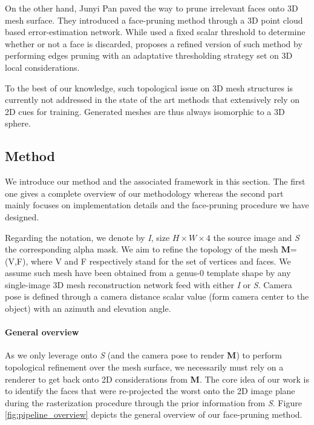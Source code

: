 On the other hand, Junyi Pan \etal \citep{pan2019deep} paved the way to prune irrelevant faces onto 3D mesh surface. They introduced a face-pruning method through a 3D point cloud based error-estimation network. While \citep{pan2019deep} used a fixed scalar threshold to determine whether or not a face is discarded, \citep{nie2020total3dunderstanding} proposes a refined version of such method by performing edges pruning with an adaptative thresholding strategy set on 3D local considerations.

To the best of our knowledge,  such topological issue on 3D mesh structures is currently not addressed in the state of the art methods that extensively rely on 2D cues for training. Generated meshes are thus always isomorphic to a 3D sphere.  

\subsection{Method}
\label{sec:method}

We introduce our method and the associated framework in this section. The first one gives a complete overview of our methodology whereas the second part mainly focuses on implementation details and the face-pruning procedure we have designed. 

Regarding the notation, we denote by \textit{I}, size $H\times W \times 4$ the source image and \textit{S} the corresponding alpha mask. We aim to refine the topology of the mesh \textbf{M}=(V,F), where V and F respectively stand for the set of vertices and faces. We assume such mesh have been obtained from a genus-0 template shape by any single-image 3D mesh reconstruction network feed with either \textit{I} or \textit{S}. Camera pose is defined through a camera distance scalar value (form camera center to the object) with an azimuth and elevation angle. 

\paragraph{General overview}
As we only leverage onto \textit{S} (and the camera pose to render \textbf{M}) to perform topological refinement over the mesh surface, we necessarily must rely on a renderer to get back onto 2D considerations from  \textbf{M}. The core idea of our work is to identify the faces that were re-projected the worst onto the 2D image plane during the rasterization procedure through the prior information from \textit{S}. Figure \ref{fig:pipeline_overview} depicts the general overview of our face-pruning method.

